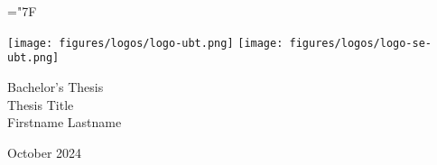 \documentclass[
	pdftex,
	final,
	12pt,
	a4paper,
	parskip=false, %
	twoside, %
	footheight=0mm, %
  	foot include=false,
	toc=bibliography, %
	toc=listof, %
]{scrbook} %
\theoremstyle{definitiontight}
\newcommand{\thesistype}{Bachelor's Thesis} %
\newcommand{\thesistitle}{Thesis Title}
\newcommand{\studentname}{Firstname Lastname}
\newcommand{\monthyear}{October 2024}
\begin{document}
\hyphenchar\font=\string"7F %

\frontmatter %

\begin{titlepage}

	\begin{center}
		\texttt{[image: figures/logos/logo-ubt.png]}	
		\hfill
		\texttt{[image: figures/logos/logo-se-ubt.png]}	
	\end{center}
	
	\vspace{4cm}
	
	\begin{center}
		{\large \thesistype}\\
		\vspace{0.5cm}
		{\LARGE\textsf{\thesistitle}}\\
		\vspace{1cm}
		{\large \studentname}\\
	\end{center}

	\vfill
		
	\begin{center}
		{\large \monthyear}
	\end{center}

\end{titlepage}

\newpage
\thispagestyle{empty}
\mbox{}
\newpage
\end{document}

